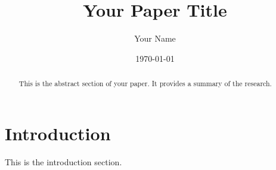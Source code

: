 \documentclass[12pt, a4paper]{article} %
\begin{document}
	
	\title{Your Paper Title}
	\author{Your Name}
	\date{\today}
	\maketitle
	
	\begin{abstract}
		This is the abstract section of your paper. It provides a summary of the research.
	\end{abstract}
	
	\section{Introduction}
	This is the introduction section.
	
	
	\printbibliography %
	
\end{document}
